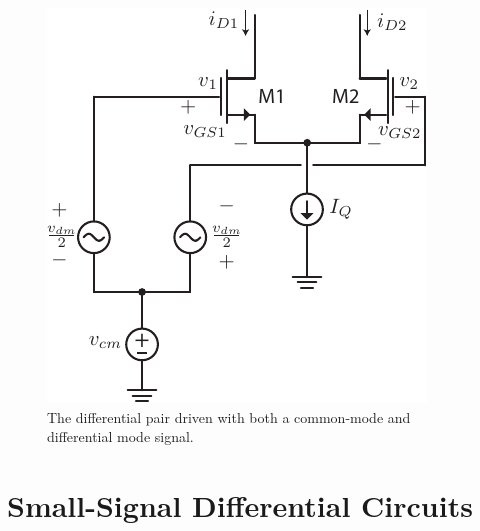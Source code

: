 \newpage
\begin{figure}[t]
\centering
\includegraphics[scale=1.25]{Diff_Pair_Diff_CM}
\caption{The differential pair driven with both a common-mode and differential mode signal.}
\label{fig:Diff_Pair_Diff_CM}
\end{figure}
\section{Small-Signal Differential Circuits}
